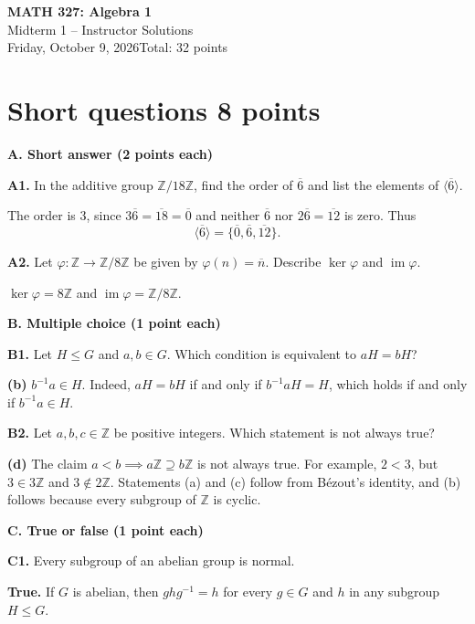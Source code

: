 \documentclass[11pt,letterpaper]{article}
\newcommand{\Z}{\mathbb Z}
\newcommand{\im}{\operatorname{im}}
\begin{document}
\begin{center}
  {\LARGE\bfseries MATH 327: Algebra 1}\\[6pt]
  {\Large Midterm 1 -- Instructor Solutions}\\[6pt]
  Friday, October 9, 2026\qquad Total: 32 points
\end{center}
\medskip

\section*{Short questions \hfill 8 points}
\textbf{A. Short answer (2 points each)}

\textbf{A1.} In the additive group $\Z/18\Z$, find the order of $\overline{6}$ and list the elements of $\langle\overline{6}\rangle$.
\begin{solutionbox}
The order is $3$, since $3\overline{6}=\overline{18}=\overline{0}$ and neither $\overline{6}$ nor $2\overline{6}=\overline{12}$ is zero. Thus
\[
  \langle\overline{6}\rangle
  =\{\overline{0},\overline{6},\overline{12}\}.
\]
\end{solutionbox}

\textbf{A2.} Let $\varphi:\Z\to\Z/8\Z$ be given by $\varphi(n)=\overline{n}$. Describe $\ker\varphi$ and $\im\varphi$.
\begin{solutionbox}
$\ker\varphi=8\Z$ and $\im\varphi=\Z/8\Z$.
\end{solutionbox}

\textbf{B. Multiple choice (1 point each)}

\textbf{B1.} Let $H\leq G$ and $a,b\in G$. Which condition is equivalent to $aH=bH$?
\begin{solutionbox}
\textbf{(b)} $b^{-1}a\in H$. Indeed,
$aH=bH$ if and only if $b^{-1}aH=H$, which holds if and only if $b^{-1}a\in H$.
\end{solutionbox}

\textbf{B2.} Let $a,b,c\in\Z$ be positive integers. Which statement is not always true?
\begin{solutionbox}
\textbf{(d)} The claim $a<b\implies a\Z\supseteq b\Z$ is not always true. For example, $2<3$, but $3\in3\Z$ and $3\notin2\Z$. Statements (a) and (c) follow from B\'ezout's identity, and (b) follows because every subgroup of $\Z$ is cyclic.
\end{solutionbox}

\textbf{C. True or false (1 point each)}

\textbf{C1.} Every subgroup of an abelian group is normal.
\begin{solutionbox}
\textbf{True.} If $G$ is abelian, then $ghg^{-1}=h$ for every $g\in G$ and $h$ in any subgroup $H\leq G$.
\end{solutionbox}
\end{document}
